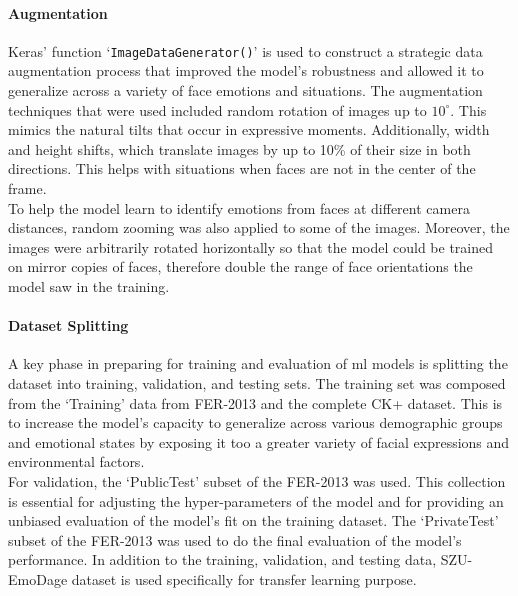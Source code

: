 \paragraph{Augmentation}
Keras' function `\texttt{ImageDataGenerator()}' is used to construct a strategic data augmentation process that improved the model's robustness and allowed it to generalize across a variety of face emotions and situations.
The augmentation techniques that were used included random rotation of images up to \(10^\circ\).
This mimics the natural tilts that occur in expressive moments.
Additionally, width and height shifts, which translate images by up to 10\% of their size in both directions.
This helps with situations when faces are not in the center of the frame.
\\
\indent To help the model learn to identify emotions from faces at different camera distances, random zooming was also applied to some of the images.
Moreover, the images were arbitrarily rotated horizontally so that the model could be trained on mirror copies of faces, therefore double the range of face orientations the model saw in the training.
\paragraph{Dataset Splitting}
A key phase in preparing for training and evaluation of \gls{ml} models is splitting the dataset into training, validation, and testing sets. 
The training set was composed from the `Training' data from FER-2013 and the complete CK+ dataset.
This is to increase the model's capacity to generalize across various demographic groups and emotional states by exposing it too a greater variety of facial expressions and environmental factors.
\\
\indent For validation, the `PublicTest' subset of the FER-2013 was used.
This collection is essential for adjusting the hyper-parameters of the model and for providing an unbiased evaluation of the model's fit on the training dataset.
The `PrivateTest' subset of the FER-2013 was used to do the final evaluation of the model's performance.
In addition to the training, validation, and testing data, SZU-EmoDage dataset is used specifically for transfer learning purpose. 
